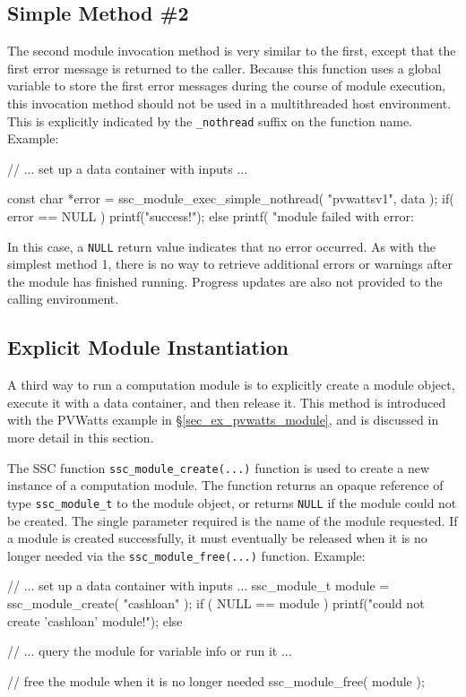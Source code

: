 \documentclass{article}
\begin{document}
\subsection{Simple Method \#2}
The second module invocation method is very similar to the first, except that the first error message is returned to the caller.  Because this function uses a global variable to store the first error messages during the course of module execution, this invocation method should not be used in a multithreaded host environment.  This is explicitly indicated by the \texttt{\_nothread} suffix on the function name.  Example:

\begin{verbatimtab}[4]
// ... set up a data container with inputs ...

const char *error = ssc_module_exec_simple_nothread( "pvwattsv1", data );
if( error == NULL )
	printf("success!\n");
else
	printf( "module failed with error: %
\end{verbatimtab}

In this case, a \texttt{NULL} return value indicates that no error occurred.  As with the simplest method 1, there is no way to retrieve additional errors or warnings after the module has finished running.  Progress updates are also not provided to the calling environment.

\subsection{Explicit Module Instantiation}
\label{sec_explicit_modules}

A third way to run a computation module is to explicitly create a module object, execute it with a data container, and then release it.  This method is introduced with the PVWatts example in \S\ref{sec_ex_pvwatts_module}, and is discussed in more detail in this section.

The SSC function \texttt{ssc\_module\_create(...)} function is used to create a new instance of a computation module.  The function returns an opaque reference of type \texttt{ssc\_module\_t} to the module object, or returns \texttt{NULL} if the module could not be created.  The single parameter required is the name of the module requested.  If a module is created successfully, it must eventually be released when it is no longer needed via the \texttt{ssc\_module\_free(...)} function.  Example:

\begin{verbatimtab}[4]
// ... set up a data container with inputs ...
ssc_module_t module = ssc_module_create( "cashloan" );
if ( NULL == module )
	printf("could not create 'cashloan' module!\n");
else
{
	// ... query the module for variable info or run it ...

	// free the module when it is no longer needed
	ssc_module_free( module );
}
\end{verbatimtab}
\end{document}
